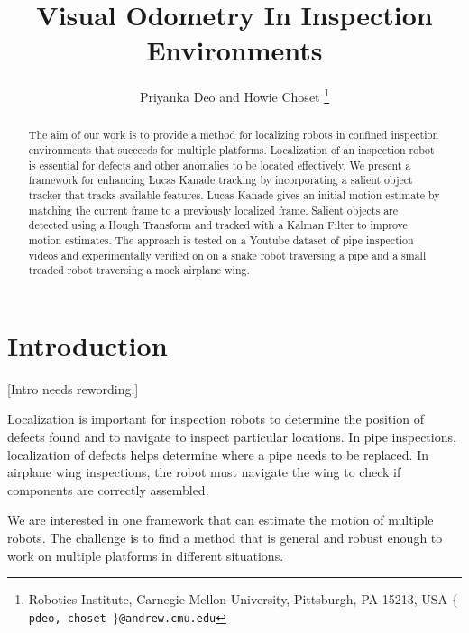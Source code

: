 \documentclass[letterpaper, 10 pt, conference]{ieeeconf}
\title{\LARGE \bf Visual Odometry In Inspection Environments}
\author{Priyanka Deo and Howie Choset%
\thanks{Robotics Institute,
Carnegie Mellon University,
Pittsburgh, PA 15213, USA
{\tt\small $\lbrace$ pdeo, choset $\rbrace$@andrew.cmu.edu}}%
}
\newcommand{\comment}[1]{{\color{red}[#1]}}
\begin{document}
\maketitle
\thispagestyle{empty}
\pagestyle{empty}


\begin{abstract}

The aim of our work is to provide a method for localizing robots in confined inspection environments that succeeds for multiple platforms. Localization of an inspection robot is essential for defects and other anomalies to be located effectively. We present a framework for enhancing Lucas Kanade tracking by incorporating a salient object tracker that tracks available features. Lucas Kanade gives an initial motion estimate by matching the current frame to a previously localized frame. Salient objects are detected using a Hough Transform and tracked with a Kalman Filter to improve motion estimates. The approach is tested on a Youtube dataset of pipe inspection videos and experimentally verified on on a snake robot traversing a pipe and a small treaded robot traversing a mock airplane wing.

\end{abstract}



\section{Introduction}

\comment{Intro needs rewording.}

Localization is important for inspection robots to determine the position of defects found and to navigate to inspect particular locations. In pipe inspections, localization of defects helps determine where a pipe needs to be replaced. In airplane wing inspections, the robot must navigate the wing to check if components are correctly assembled.

We are interested in one framework that can estimate the motion of multiple robots. The challenge is to find a method that is general and robust enough to work on multiple platforms in different situations.
\end{document}
